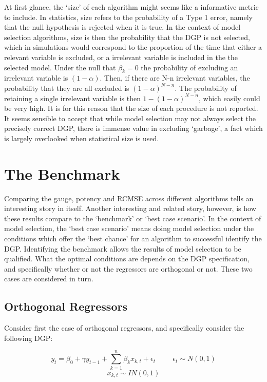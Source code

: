 \documentclass[11pt, oneside]{book}   	%
\begin{document}
At first glance, the `size' of each algorithm might seems like a informative metric to include. In statistics, size refers to the probability of a Type 1 error, namely that the null hypothesis is rejected when it is true. In the context of model selection algorithms, size is then the probability that the DGP is not selected, which in simulations would correspond to the proportion of the time that either a relevant variable is excluded, or a irrelevant variable is included in the the selected model. Under the null that $\beta_{k} = 0$ the probability of excluding an irrelevant variable is $(1-\alpha)$. Then, if there are N-n irrelevant variables, the probability that they are all excluded is $(1-\alpha)^{N-n}$. The probability of retaining a single irrelevant variable is then $ 1 - (1-\alpha)^{N-n}$, which easily could be very high. It is for this reason that the size of each procedure is not reported. It seems sensible to accept that while model selection may not always select the precisely correct DGP, there is immense value in excluding `garbage', a fact which is largely overlooked when statistical size is used. 




\section{The Benchmark}

Comparing the gauge, potency and RCMSE across different algorithms tells an interesting story in itself. Another interesting and related story, however, is how these results compare to the `benchmark' or `best case scenario'. In the context of model selection, the `best case scenario' means doing model selection under the conditions which offer the `best chance' for an algorithm to successful identify the DGP. Identifying the benchmark allows the results of model selection to be qualified. What the optimal conditions are depends on the DGP specification, and specifically whether or not the regressors are orthogonal or not. These two cases are considered in turn.

\subsection{Orthogonal Regressors}

Consider first the case of orthogonal regressors, and specifically consider the following DGP:

$$y_{t}=\beta_{0} + \gamma y_{t-1}+\sum_{k=1}^{n}\beta_{k}x_{k,t} + \epsilon_{t} \hspace{1cm} \epsilon_{t} \sim N(0, 1) $$
$$x_{k,t} \sim IN(0, 1) $$
\end{document}
